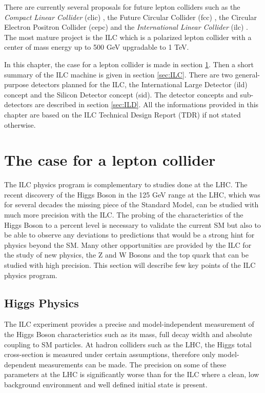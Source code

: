 There are currently several proposals for future lepton colliders such as the \textit{Compact Linear Collider} (\acrshort{clic}) \cite{CLIC_CDR}, the Future Circular Collider (\acrshort{fcc}) \cite{Benedikt:2015kqj}, the Circular Electron Positron Collider (\acrshort{cepc}) \cite{CEPC-SPPCStudyGroup:2015csa, CEPC-SPPCStudyGroup:2015esa} and the \textit{International Linear Collider} (\acrshort{ilc}) \cite{ILC_TDR_Vol1}. The most mature project is the ILC which is a polarized lepton collider with a center of mass energy up to 500 GeV upgradable to 1 TeV.

In this chapter, the case for a lepton collider is made in section \ref{sec:ILC_Physics}. Then a short summary of the ILC machine is given in section \ref{sec:ILC}. There are two general-purpose detectors planned for the ILC, the International Large Detector (\acrshort{ild}) concept and the Silicon Detector concept (\acrshort{sid}). The detector concepts and sub-detectors are described in section \ref{sec:ILD}. All the informations provided in this chapter are based on the ILC Technical Design Report (TDR) \cite{ILC_TDR_Vol1, ILC_TDR_Vol2, ILC_TDR_Vol3.1, ILC_TDR_Vol3.2, ILC_TDR_Vol4} if not stated otherwise.

\section{The case for a lepton collider}
\label{sec:ILC_Physics}

The ILC physics program is complementary to studies done at the LHC. The recent discovery of the Higgs Boson in the 125 GeV range at the LHC, which was for several decades the missing piece of the Standard Model, can be studied with much more precision with the ILC. The probing of the characteristics of the Higgs Boson to a percent level is necessary to validate the current SM but also to be able to observe any deviations to predictions that would be a strong hint for physics beyond the SM. Many other opportunities are provided by the ILC for the study of new physics, the Z and W Bosons and the top quark that can be studied with high precision. This section will describe few key points of the ILC physics program.

\subsection{Higgs Physics}

The ILC experiment provides a precise and model-independent measurement of the Higgs Boson characteristics such as its mass, full decay width and absolute coupling to SM particles. At hadron colliders such as the LHC, the Higgs total cross-section is measured under certain assumptions, therefore only model-dependent measurements can be made. The precision on some of these parameters at the LHC is significantly worse than for the ILC where a clean, low background environment and well defined initial state is present.

